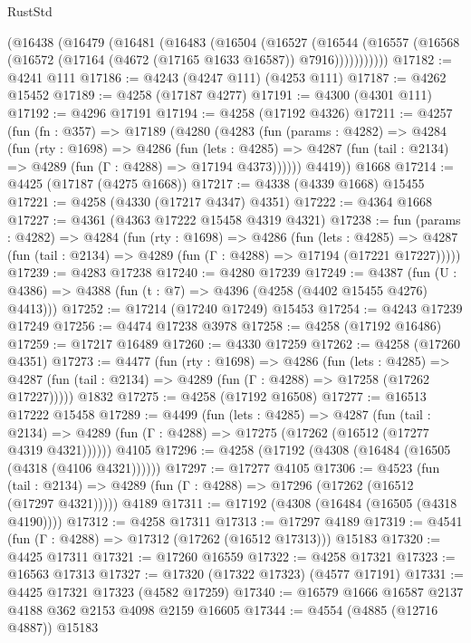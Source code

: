 \begin{lexlean}{RustStd}
\begin{coremodule}
    (@16438
      (@16479
        (@16481
          (@16483
            (@16504
              (@16527
                (@16544
                  (@16557 (@16568 (@16572 (@17164 (@4672 (@17165 @1633 @16587)) @7916)))))))))))
@17182 := @4241 @111
@17186 := @4243 (@4247 @111) (@4253 @111)
@17187 := @4262 @15452
@17189 := @4258 (@17187 @4277)
@17191 := @4300 (@4301 @111)
@17192 := @4296 @17191
@17194 := @4258 (@17192 @4326)
@17211 := @4257
    (fun (fn : @357) =>
    @17189
      (@4280
        (@4283
          (fun (params : @4282) =>
          @4284
            (fun (rty : @1698) =>
            @4286
              (fun (lets : @4285) =>
              @4287 (fun (tail : @2134) => @4289 (fun (Γ : @4288) => @17194 @4373))))))
        @4419))
    @1668
@17214 := @4425 (@17187 (@4275 @1668))
@17217 := @4338 (@4339 @1668) @15455
@17221 := @4258 (@4330 (@17217 @4347) @4351)
@17222 := @4364 @1668
@17227 := @4361 (@4363 @17222 @15458 @4319 @4321)
@17238 := fun (params : @4282) =>
  @4284
    (fun (rty : @1698) =>
    @4286
      (fun (lets : @4285) =>
      @4287 (fun (tail : @2134) => @4289 (fun (Γ : @4288) => @17194 (@17221 @17227)))))
@17239 := @4283 @17238
@17240 := @4280 @17239
@17249 := @4387
    (fun (U : @4386) => @4388 (fun (t : @7) => @4396 (@4258 (@4402 @15455 @4276) @4413)))
@17252 := @17214 (@17240 @17249) @15453
@17254 := @4243 @17239 @17249
@17256 := @4474 @17238 @3978
@17258 := @4258 (@17192 @16486)
@17259 := @17217 @16489
@17260 := @4330 @17259
@17262 := @4258 (@17260 @4351)
@17273 := @4477
    (fun (rty : @1698) =>
    @4286
      (fun (lets : @4285) =>
      @4287 (fun (tail : @2134) => @4289 (fun (Γ : @4288) => @17258 (@17262 @17227)))))
    @1832
@17275 := @4258 (@17192 @16508)
@17277 := @16513 @17222 @15458
@17289 := @4499
    (fun (lets : @4285) =>
    @4287
      (fun (tail : @2134) =>
      @4289 (fun (Γ : @4288) => @17275 (@17262 (@16512 (@17277 @4319 @4321))))))
    @4105
@17296 := @4258 (@17192 (@4308 (@16484 (@16505 (@4318 (@4106 @4321))))))
@17297 := @17277 @4105
@17306 := @4523
    (fun (tail : @2134) => @4289 (fun (Γ : @4288) => @17296 (@17262 (@16512 (@17297 @4321)))))
    @4189
@17311 := @17192 (@4308 (@16484 (@16505 (@4318 @4190))))
@17312 := @4258 @17311
@17313 := @17297 @4189
@17319 := @4541 (fun (Γ : @4288) => @17312 (@17262 (@16512 @17313))) @15183
@17320 := @4425 @17311
@17321 := @17260 @16559
@17322 := @4258 @17321
@17323 := @16563 @17313
@17327 := @17320 (@17322 @17323) (@4577 @17191)
@17331 := @4425 @17321 @17323 (@4582 @17259)
@17340 := @16579 @1666 @16587 @2137 @4188 @362 @2153 @4098 @2159 @16605
@17344 := @4554 (@4885 (@12716 @4887)) @15183

\end{coremodule}
\end{lexlean}
